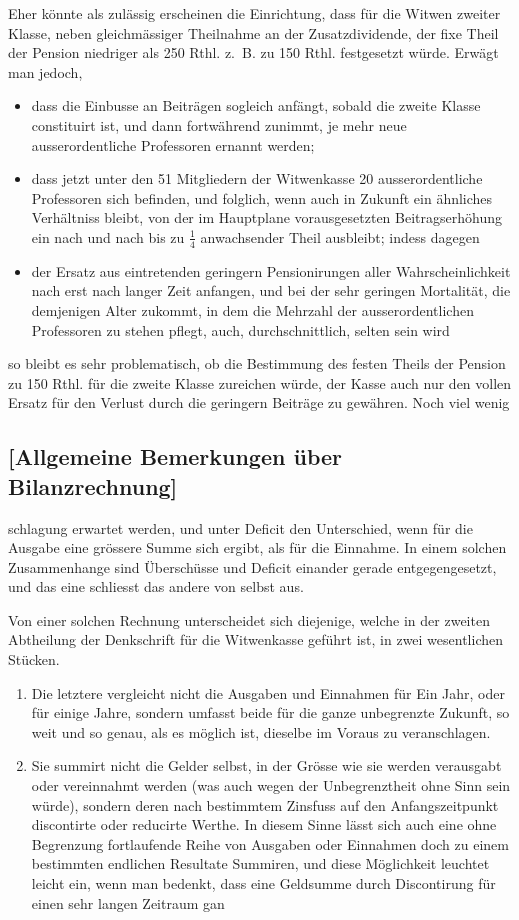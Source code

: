 \documentclass[12pt,a4paper]{article}
\begin{document}
Eher könnte als zulässig erscheinen die Einrichtung, dass für die Witwen zweiter Klasse, neben gleichmässiger Theilnahme an der Zusatzdividende, der fixe Theil der Pension niedriger als 250 Rthl. z.~B. zu 150 Rthl. festgesetzt würde. Erwägt man jedoch,
\begin{itemize}
\item[] dass die Einbusse an Beiträgen sogleich anfängt, sobald die zweite Klasse constituirt ist, und dann fortwährend zunimmt, je mehr neue ausserordentliche Professoren ernannt werden;
\item[] dass jetzt unter den 51 Mitgliedern der Witwenkasse 20 ausserordentliche Professoren sich befinden, und folglich, wenn auch in Zukunft ein ähnliches Verhältniss bleibt, von der im Hauptplane vorausgesetzten Beitragserhöhung ein nach und nach bis zu $\frac{1}{4}$ anwachsender Theil ausbleibt; indess dagegen
\item[] der Ersatz aus eintretenden geringern Pensionirungen aller Wahrscheinlichkeit nach erst nach langer Zeit anfangen, und bei der sehr geringen Mortalität, die demjenigen Alter zukommt, in dem die Mehrzahl der ausserordentlichen Professoren zu stehen pflegt, auch, durchschnittlich, selten sein wird
\end{itemize}
so bleibt es sehr problematisch, ob die Bestimmung des festen Theils der Pension zu 150 Rthl. für die zweite Klasse zureichen würde, der Kasse auch nur den vollen Ersatz für den Verlust durch die geringern Beiträge zu gewähren. Noch viel wenig

\subsection*{[Allgemeine Bemerkungen über Bilanzrechnung]}

schlagung erwartet werden, und unter Deficit den Unterschied, wenn für die Ausgabe eine grössere Summe sich ergibt, als für die Einnahme. In einem solchen Zusammenhange sind Überschüsse und Deficit einander gerade entgegengesetzt, und das eine schliesst das andere von selbst aus.

Von einer solchen Rechnung unterscheidet sich diejenige, welche in der zweiten Abtheilung der Denkschrift für die Witwenkasse geführt ist, in zwei wesentlichen Stücken.
\begin{enumerate}
\item Die letztere vergleicht nicht die Ausgaben und Einnahmen für Ein Jahr, oder für einige Jahre, sondern umfasst beide für die ganze unbegrenzte Zukunft, so weit und so genau, als es möglich ist, dieselbe im Voraus zu veranschlagen.
\item Sie summirt nicht die Gelder selbst, in der Grösse wie sie werden verausgabt oder vereinnahmt werden (was auch wegen der Unbegrenztheit ohne Sinn sein würde), sondern deren nach bestimmtem Zinsfuss auf den Anfangszeitpunkt discontirte oder reducirte Werthe. In diesem Sinne lässt sich auch eine ohne Begrenzung fortlaufende Reihe von Ausgaben oder Einnahmen doch zu einem bestimmten endlichen Resultate Summiren, und diese Möglichkeit leuchtet leicht ein, wenn man bedenkt, dass eine Geldsumme durch Discontirung für einen sehr langen Zeitraum gan
\end{enumerate}
\end{document}
